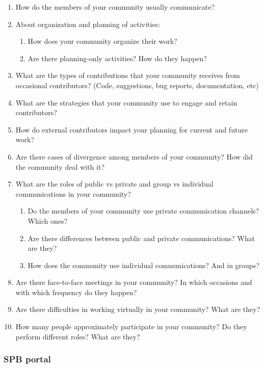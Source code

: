 \documentclass{sigchi}
\begin{document}
\begin{enumerate}
  \item How do the members of your community usually communicate?

  \item About organization and planning of activities:
  \begin{enumerate}
    \item How does your community organize their work?
    \item Are there planning-only activities? How do they happen?
  \end{enumerate}
  \item What are the types of contributions that your community receives from occasional contributors? (Code, suggestions, bug reports, documentation, etc)
  \item What are the strategies that your community use to engage and retain contributors?
  \item How do external contributors impact your planning for current and future work?
  \item Are there cases of divergence among members of your community? How did the community deal with it?
  \item What are the roles of public vs private and group vs individual communications in your community?
  \begin{enumerate}
    \item Do the members of your community use private communication channels? Which ones?
    \item Are there differences between public and private communications? What are they?
    \item How does the community use individual communications? And in groups?
  \end{enumerate}
  \item Are there face-to-face meetings in your community? In which occasions and with which frequency do they happen?
  \item Are there difficulties in working virtually in your community? What are they?
  \item How many people approximately participate in your community? Do they perform different roles? What are they?
\end{enumerate}

\subsubsection{SPB portal}
\end{document}
